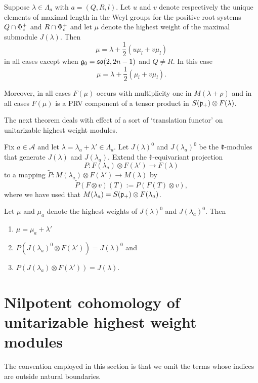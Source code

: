 \begin{proposition}
 Suppose $\lambda\in\Lambda_a$ with $a=(Q,R,l)$. Let $u$ and $v$ denote respectively the unique elements of maximal length in the Weyl groups for the positive root systems $Q\cap \Phi^+_c$ and $R\cap \Phi^+_c$ and let $\mu$ denote the highest weight of the maximal submodule $J(\lambda)$. Then
 \[
  \mu = \lambda + \frac{1}{2}(u \mu_l + v \mu_l)
 \]
 in all cases except when $\mathfrak{g}_0=\mathfrak{so}(2,2n-1)$ and $Q\neq R$. In this case
 \[
  \mu = \lambda + \frac{1}{2}(\mu_l + v\mu_l).
 \]

 Moreover, in all cases $F(\mu)$ occurs with multiplicity one in $M(\lambda+\rho)$ and in all cases $F(\mu)$ is a PRV component of a tensor product in $S(\mathfrak{p}_+)\otimes F(\lambda)$.
\end{proposition}

The next theorem  deals with effect of a sort of `translation functor' on unitarizable highest weight modules.
\begin{theorem}
 Fix $a\in\mathcal{A}$ and let $\lambda = \lambda_a + \lambda'\in\Lambda_a$. Let $J(\lambda)^0$ and $J(\lambda_a)^0$ be the $\mathfrak{k}$-modules that generate $J(\lambda)$ and $J(\lambda_a)$. Extend the $\mathfrak{k}$-equivariant projection \[P:F(\lambda_a)\otimes F(\lambda') \to F(\lambda)\] to a mapping $\widetilde{P}:M(\lambda_a) \otimes F(\lambda') \to M(\lambda)$ by \[\widetilde{P}(F\otimes v) (T) := P(F(T)\otimes v),\]
  where we have used that $M(\lambda_a) = S(\mathfrak{p}_+)\otimes F(\lambda_a)$.

Let $\mu$ and $\mu_a$ denote the highest weights of  $J(\lambda)^0$ and $J(\lambda_a)^0$. Then
 \begin{enumerate}
  \item $\mu  = \mu_a+\lambda'$
  \item $P(J(\lambda_a)^0\otimes F(\lambda')) = J(\lambda)^0$ and 
  \item $P(J(\lambda_a)\otimes F(\lambda')) = J(\lambda)$.
 \end{enumerate}
\end{theorem}

\section{Nilpotent cohomology of unitarizable highest weight modules}

The convention employed in this section is that we omit the terms whose indices are outside natural boundaries. 

